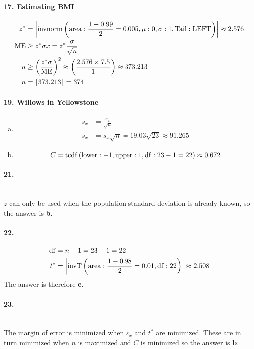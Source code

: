 \documentclass[../Homework]{subfiles}
\begin{document}
			\paragraph{17. Estimating BMI}
				\begin{align*}
					z^* &= \left|\operatorname{invnorm}\left(\operatorname{area}:\frac{1 - 0.99}{2} = 0.005, \mu: 0, \sigma: 1, \mathrm{Tail: LEFT}\right)\right| \approx 2.576 \\
					\operatorname{ME} &\ge z^*\sigma{\bar{x}} = z^*\frac{\sigma}{\sqrt{n}} \\
					n &\ge \left(\frac{z^*\sigma}{\operatorname{ME}}\right)^2 \approx \left(\frac{2.576 \times 7.5}{1}\right) \approx 373.213 \\
					n &= \lceil 373.213 \rceil = 374
				\end{align*}
			\paragraph{19. Willows in Yellowstone}
				\begin{enumerate}[a.]
					\item
						\begin{align*}
							s_{\bar{x}} &= \frac{s_x}{\sqrt{n}} \\
							s_x &= s_{\bar{x}}\sqrt{n} = 19.03\sqrt{23} \approx 91.265
						\end{align*}
					\item
						\[C = \operatorname{tcdf}\left(\operatorname{lower}: -1, \operatorname{upper}: 1, \operatorname{df}: 23 - 1 = 22\right) \approx 0.672\]
				\end{enumerate}
			\paragraph{21.}\ \\
			$z$ can only be used when the population standard deviation is already known, so the answer is \textbf{b}.
			\paragraph{22.}
				\begin{align*}
					\operatorname{df} &= n - 1 = 23 - 1 = 22 \\
					t^* &= \left|\operatorname{invT}\left(\operatorname{area}: \frac{1 - 0.98}{2} = 0.01, \operatorname{df}: 22\right)\right| \approx 2.508
				\end{align*}
				The answer is therefore \textbf{e}.
			\paragraph{23.}\ \\
				The margin of error is minimized when $s_{\bar{x}}$ and $t^*$ are minimized. These are in turn minimized when $n$ is maximized and $C$ is minimized so the answer is \textbf{b}.
\end{document}
